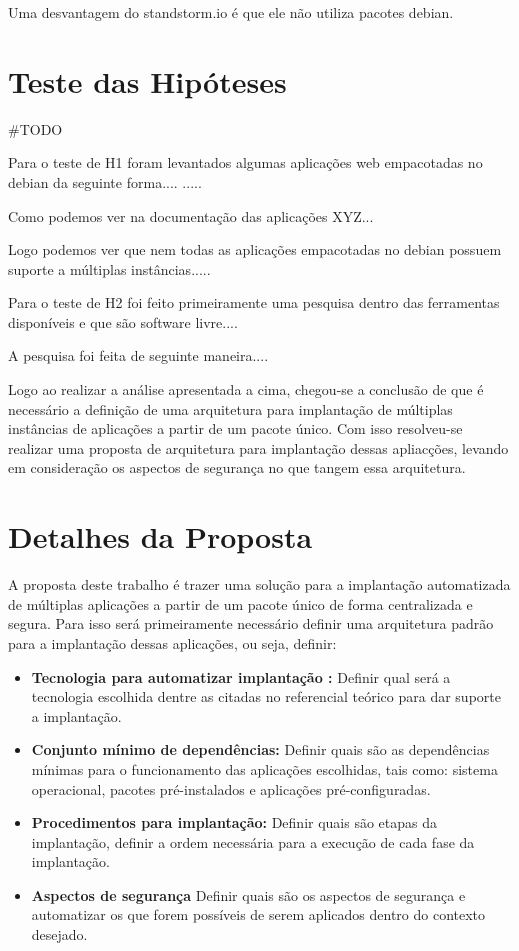 Uma desvantagem do standstorm.io é que ele não utiliza pacotes debian.


\section{Teste das Hipóteses}

#TODO

Para o teste de H1 foram levantados algumas aplicações web empacotadas no debian
da seguinte forma....  .....

Como podemos ver na documentação das aplicações XYZ...

Logo podemos ver que nem todas as aplicações empacotadas no debian possuem
suporte a múltiplas instâncias.....


Para o teste de H2 foi feito primeiramente uma pesquisa dentro das ferramentas
disponíveis e que são software livre....

A pesquisa foi feita de seguinte maneira....

Logo ao realizar a análise apresentada a cima, chegou-se a conclusão de que
é necessário a definição de uma arquitetura para implantação de múltiplas
instâncias de aplicações a partir de um pacote único. Com isso resolveu-se
realizar uma proposta de arquitetura para implantação dessas apliacções, levando
em consideração os aspectos de segurança no que tangem essa arquitetura.

\section{Detalhes da Proposta}

A proposta deste trabalho é trazer uma solução para a implantação automatizada
de múltiplas aplicações a partir de um pacote único de forma centralizada e segura.
Para isso será primeiramente necessário definir uma arquitetura padrão para a
implantação dessas aplicações, ou seja, definir:

\begin{itemize}
  \item  \textbf{Tecnologia para automatizar implantação :}  Definir qual será a
  tecnologia escolhida dentre as citadas no referencial teórico para dar suporte
  a implantação.
  \item  \textbf{Conjunto mínimo de dependências:} Definir quais são as dependências
  mínimas para o funcionamento das aplicações escolhidas, tais como: sistema operacional,
  pacotes pré-instalados e aplicações pré-configuradas.
  \item  \textbf{Procedimentos para implantação:} Definir quais são etapas da implantação,
  definir a ordem necessária para a execução de cada fase da implantação.
  \item  \textbf{Aspectos de segurança} Definir quais são os aspectos de segurança
  e automatizar os que forem possíveis de serem aplicados dentro do contexto desejado.
\end{itemize}

